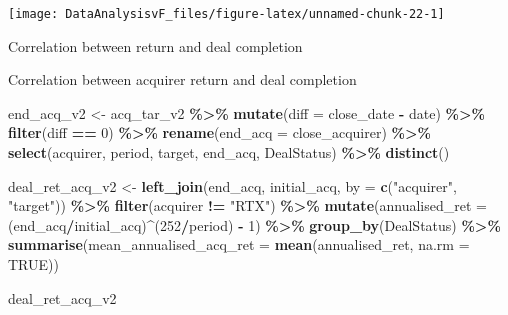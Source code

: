 \documentclass[
]{article}
\newenvironment{Shaded}{\begin{snugshade}}{\end{snugshade}}
\newcommand{\DataTypeTok}[1]{\textcolor[rgb]{0.13,0.29,0.53}{#1}}
\newcommand{\DecValTok}[1]{\textcolor[rgb]{0.00,0.00,0.81}{#1}}
\newcommand{\KeywordTok}[1]{\textcolor[rgb]{0.13,0.29,0.53}{\textbf{#1}}}
\newcommand{\NormalTok}[1]{#1}
\newcommand{\OperatorTok}[1]{\textcolor[rgb]{0.81,0.36,0.00}{\textbf{#1}}}
\newcommand{\OtherTok}[1]{\textcolor[rgb]{0.56,0.35,0.01}{#1}}
\newcommand{\StringTok}[1]{\textcolor[rgb]{0.31,0.60,0.02}{#1}}
\begin{document}
\begin{center}\texttt{[image: DataAnalysisvF\_files/figure-latex/unnamed-chunk-22-1]} \end{center}

Correlation between return and deal completion

Correlation between acquirer return and deal completion

\begin{Shaded}
\begin{Highlighting}[]
\NormalTok{end\_acq\_v2 \textless{}{-}}\StringTok{ }\NormalTok{acq\_tar\_v2 }\OperatorTok{\%\textgreater{}\%}
\StringTok{  }\KeywordTok{mutate}\NormalTok{(}\DataTypeTok{diff =}\NormalTok{ close\_date }\OperatorTok{{-}}\StringTok{ }\NormalTok{date) }\OperatorTok{\%\textgreater{}\%}
\StringTok{  }\KeywordTok{filter}\NormalTok{(diff }\OperatorTok{==}\StringTok{ }\DecValTok{0}\NormalTok{) }\OperatorTok{\%\textgreater{}\%}
\StringTok{  }\KeywordTok{rename}\NormalTok{(}\DataTypeTok{end\_acq =}\NormalTok{ close\_acquirer) }\OperatorTok{\%\textgreater{}\%}
\StringTok{  }\KeywordTok{select}\NormalTok{(acquirer, period, target, end\_acq, DealStatus) }\OperatorTok{\%\textgreater{}\%}
\StringTok{  }\KeywordTok{distinct}\NormalTok{()}


\NormalTok{deal\_ret\_acq\_v2 \textless{}{-}}\StringTok{ }\KeywordTok{left\_join}\NormalTok{(end\_acq, initial\_acq, }\DataTypeTok{by =} \KeywordTok{c}\NormalTok{(}\StringTok{"acquirer"}\NormalTok{, }\StringTok{"target"}\NormalTok{)) }\OperatorTok{\%\textgreater{}\%}
\StringTok{  }\KeywordTok{filter}\NormalTok{(acquirer }\OperatorTok{!=}\StringTok{ "RTX"}\NormalTok{) }\OperatorTok{\%\textgreater{}\%}
\StringTok{  }\KeywordTok{mutate}\NormalTok{(}\DataTypeTok{annualised\_ret =}\NormalTok{ (end\_acq}\OperatorTok{/}\NormalTok{initial\_acq)}\OperatorTok{\^{}}\NormalTok{(}\DecValTok{252}\OperatorTok{/}\NormalTok{period) }\OperatorTok{{-}}\StringTok{ }\DecValTok{1}\NormalTok{) }\OperatorTok{\%\textgreater{}\%}
\StringTok{  }\KeywordTok{group\_by}\NormalTok{(DealStatus) }\OperatorTok{\%\textgreater{}\%}
\StringTok{  }\KeywordTok{summarise}\NormalTok{(}\DataTypeTok{mean\_annualised\_acq\_ret =} \KeywordTok{mean}\NormalTok{(annualised\_ret, }\DataTypeTok{na.rm =} \OtherTok{TRUE}\NormalTok{))}

\NormalTok{deal\_ret\_acq\_v2}
\end{Highlighting}
\end{Shaded}

 
  \providecommand{\huxb}[2]{\arrayrulecolor[RGB]{#1}\global\arrayrulewidth=#2pt}
  \providecommand{\huxvb}[2]{\color[RGB]{#1}\vrule width #2pt}
  \providecommand{\huxtpad}[1]{\rule{0pt}{#1}}
  \providecommand{\huxbpad}[1]{\rule[-#1]{0pt}{#1}}
\end{document}
